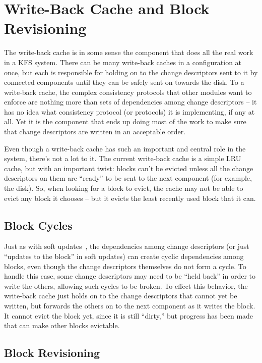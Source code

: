 \section{Write-Back Cache and Block Revisioning}
\label{sec:wbcache}

The write-back cache is in some sense the component that does all the real work
in a KFS system. There can be many write-back caches in a configuration at once,
but each is responsible for holding on to the change descriptors sent to it by
connected components until they can be safely sent on towards the disk. To a
write-back cache, the complex consistency protocols that other modules want to
enforce are nothing more than sets of dependencies among change descriptors --
it has no idea what consistency protocol (or protocols) it is implementing, if
any at all. Yet it is the component that ends up doing most of the work to make
sure that change descriptors are written in an acceptable order.

Even though a write-back cache has such an important and central role in the
system, there's not a lot to it. The current write-back cache is a simple LRU
cache, but with an important twist: blocks can't be evicted unless all the
change descriptors on them are ``ready'' to be sent to the next component (for
example, the disk). So, when looking for a block to evict, the cache may not be
able to evict any block it chooses -- but it evicts the least recently used
block that it can.

\subsection{Block Cycles}
\label{subsec:blockcycles}

Just as with soft updates~\cite{ganger00soft}, the dependencies among change
descriptors (or just ``updates to the block'' in soft updates) can create cyclic
dependencies among blocks, even though the change descriptors themselves do not
form a cycle. To handle this case, some change descriptors may need to be ``held
back'' in order to write the others, allowing such cycles to be broken.  To
effect this behavior, the write-back cache just holds on to the change
descriptors that cannot yet be written, but forwards the others on to the next
component as it writes the block. It cannot evict the block yet, since it is
still ``dirty,'' but progress has been made that can make other blocks
evictable.

\subsection{Block Revisioning}

